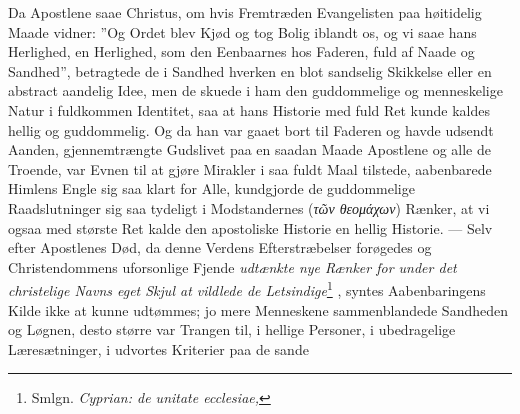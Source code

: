 \documentclass[12pt]{book}
\newcommand{\opage}[1]{\marginnote{\footnotesize\textit{[#1]}}}
\begin{document}
Da Apostlene saae Christus, om hvis Fremtræden Evangelisten paa høitidelig Maade
vidner: ”Og Ordet blev Kjød og tog Bolig iblandt os, og vi saae hans Herlighed,
en Herlighed, som den Eenbaarnes hos Faderen, fuld af Naade og Sandhed”,
betragtede de i Sandhed hverken en blot sandselig Skikkelse eller en abstract
aandelig Idee, men de skuede i ham den guddommelige og menneskelige Natur i
fuldkommen Identitet, saa at hans Historie med fuld Ret kunde kaldes hellig og
guddommelig. Og da han var gaaet bort til Faderen og havde udsendt Aanden,
gjennemtrængte Gudslivet paa en saadan Maade Apostlene og alle de Troende, var
\opage{55} \setcounter{footnote}{0}%
Evnen til at gjøre Mirakler i saa fuldt Maal tilstede, aabenbarede Himlens Engle
sig saa klart for Alle, kundgjorde de guddommelige Raadslutninger sig saa
tydeligt i Modstandernes (\textit{τῶν θεομάχων}) Rænker, at vi ogsaa med største
Ret kalde den apostoliske Historie en hellig Historie. --- Selv efter Apostlenes
Død, da denne Verdens Efterstræbelser forøgedes og Christendommens uforsonlige
Fjende \emph{udtænkte nye Rænker for under det christelige Navns eget Skjul at
vildlede de Letsindige}\footnote{Smlgn. \textit{Cyprian: de unitate ecclesiae,}}%
, syntes Aabenbaringens Kilde ikke at kunne udtømmes; jo mere Menneskene
sammenblandede Sandheden og Løgnen, desto større var Trangen til, i hellige
Personer, i ubedragelige Læresætninger, i udvortes Kriterier paa de sande
\end{document}

